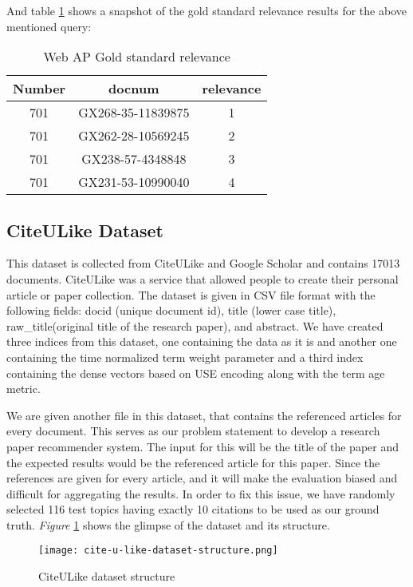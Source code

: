 And table \ref{tab:web-ap-gold} shows a snapshot of the gold standard relevance results for the above mentioned query:
\begin{table}[h!]
    \centering
    \begin{tabular}{|c|c|c|}
    \hline
         \textbf{Number }& \textbf{docnum} & \textbf{relevance}  \\
         \hline
         701 & GX268-35-11839875 & 1\\
         701 & GX262-28-10569245 & 2 \\
         701 & GX238-57-4348848	& 3	\\
         701 & GX231-53-10990040 &	4\\	
         \hline
    \end{tabular}
    \caption{Web AP Gold standard relevance}
    \label{tab:web-ap-gold}
\end{table}


\subsection{CiteULike Dataset}
\cite{DBLP:conf/ijcai/WangCL13} This dataset is collected from CiteULike and Google Scholar and contains 17013 documents. CiteULike was a service that allowed people to create their personal article or paper collection. The dataset is given in CSV file format with the following fields: docid (unique document id), title (lower case title), raw\_title(original title of the research paper), and abstract. We have created three indices from this dataset, one containing the data as it is and another one containing the time normalized term weight parameter and a third index containing the dense vectors based on USE encoding along with the term age metric.

We are given another file in this dataset, that contains the referenced articles for every document. This serves as our problem statement to develop a research paper recommender system. The input for this will be the title of the paper and the expected results would be the referenced article for this paper. Since the references are given for every article, and it will make the evaluation biased and difficult for aggregating the results. In order to fix this issue, we have randomly selected 116 test topics having exactly 10 citations to be used as our ground truth. 
\textit{Figure} \ref{fig:citeulike-dataset} shows the glimpse of the dataset and its structure.

\begin{figure}[h!]
    \centering
    \texttt{[image: cite-u-like-dataset-structure.png]}
    \caption{CiteULike dataset structure }
    \label{fig:citeulike-dataset}
\end{figure}

